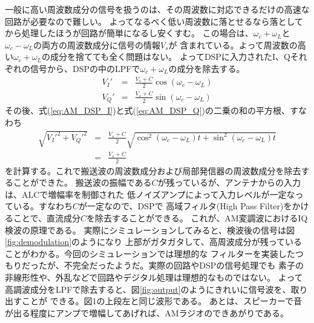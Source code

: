 一般に高い周波数成分の信号を扱うのは、その周波数に対応できるだけの高速な回路が必要なので難しい。
よってなるべく低い周波数に落とせるなら落としてから処理したほうが回路が簡単になるし安くすむ。
この場合は、$\omega_c + \omega_L$と$\omega_c - \omega_L$の両方の周波数成分に信号の情報$V_s$が
含まれている。よって周波数の高い$\omega_c + \omega_L$の成分を捨てても全く問題はない。
よってDSPに入力されたI、Qそれぞれの信号から、DSPの中のLPFで$\omega_c + \omega_L$の成分を除去する。
\begin{eqnarray}
V_I' &=& \frac{V_s+C}{2}\cos(\omega_c - \omega_L) \label{eq:AM_DSP_I}\\
V_Q' &=& \frac{V_s+C}{2}\sin(\omega_c - \omega_L) \label{eq:AM_DSP_Q}
\end{eqnarray}
その後、式(\ref{eq:AM_DSP_I})と式(\ref{eq:AM_DSP_Q})の二乗の和の平方根、すなわち
\begin{eqnarray}
\sqrt{V_I'^2 + V_Q'^2} &=& \frac{V_s+C}{2}\sqrt{\cos^2(\omega_c - \omega_L)t + \sin^2(\omega_c - \omega_L)t }\\
&=& \frac{V_s+C}{2} 
\end{eqnarray}
を計算する。これで搬送波の周波数成分および局部発信器の周波数成分を除去することができた。
搬送波の振幅である$C$が残っているが、アンテナからの入力は、ALCで増幅率を制御された
低ノイズアンプによって入力レベルが一定なっている。すなわち$C$が一定なので、DSPで
高域フィルタ(High Pass Filter)をかけることで、直流成分$C$を除去することができる。
これが、AM変調波におけるIQ検波の原理である。
実際にシミュレーションしてみると、検波後の信号は図\ref{fig:demodulation}のようになり
上部がガタガタして、高周波成分が残っていることがわかる。今回のシミュレーションでは理想的な
フィルターを実装したつもりだったが、不完全だったようだ。実際の回路やDSPの信号処理でも
素子の非線形性や、外乱などで回路やデジタル処理は理想的なものではない。
よって高調波成分をLPFで除去すると、図\ref{fig:output}のようにきれいに信号波を、取り出すことが
できる。図1の上段左と同じ波形である。
あとは、スピーカーで音が出る程度にアンプで増幅してあげれば、AMラジオのできあがりである。
